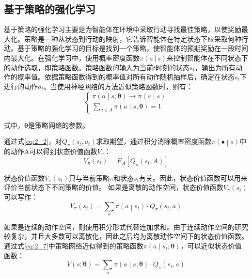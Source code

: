 \subsection{基于策略的强化学习}

基于策略的强化学习主要是为智能体在环境中采取行动寻找最佳策略，以使奖励最大化。策略是一种从状态到行动的映射，它告诉智能体在特定状态下应采取何种行动。基于策略的强化学习的目标是找到一个策略，使智能体的预期奖励在一段时间内最大化。在强化学习中，使用概率密度函数$\pi(a│s)$来控制智能体在不同状态下的动作选取，即策略函数。策略函数的输入为当前$t$时刻的状态$s_t$，输出为所有动作的概率值。依据策略函数得到的概率值对所有动作随机抽样后，确定在状态$s_t$下进行的动作$a_t$。当使用神经网络的方法近似策略函数时，则有：
\begin{equation}
\label{eq:2_7}
\left\{\begin{array}{l}
\pi(a \mid s ; \boldsymbol{\theta}) \rightarrow \pi(a \mid s) \\
\sum_{a \in A} \pi(a \mid s ; \boldsymbol{\theta})=1
\end{array}\right.
\end{equation}

式中，$\boldsymbol{\theta}$是策略网络的参数。

通过式\ref{eq:2_2}，对$Q_\pi\left(s_t,a_t\right)$求取期望，通过积分消除概率密度函数$\pi\left(\bullet\middle| s\right)$中的动作A可以得到状态价值函数$V_\pi$：
\begin{equation}
\label{eq:2_8}
V_\pi\left(s_t\right)=E_A[Q_\pi (s_t,A)]
\end{equation}

状态价值函数$V_\pi\left(s_t\right)$只与当前策略$\pi$和状态$s_t$有关。因此，状态价值函数可以用来评价当前状态下不同策略的价值。
	如果是离散的动作空间，状态价值函数$V_\pi\left(s_t\right)$可以写作：
\begin{equation}	
\label{eq:2_9}
V_\pi\left(s_t\right)=\sum_{a}{\pi\left(a\middle| s_t\right)\cdot}Q_\pi\left(s_t,a\right)
\end{equation}

如果是连续的动作空间，则使用积分形式代替连加求和。由于连续动作空间的研究较复杂，并且大多数可以离散化，因此之后均为离散动作空间下的状态价值函数。通过式\ref{eq:2_7}中策略网络近似得到的策略函数$\pi(a\mid s_t;\boldsymbol{\theta})$，可以近似状态价值函数：
\begin{equation}	
\label{eq:2_10}
V(s ; \boldsymbol{\theta})=\sum_a \pi(a \mid s ; \boldsymbol{\theta}) \cdot Q_\pi\left(s_t, a\right)
\end{equation}

